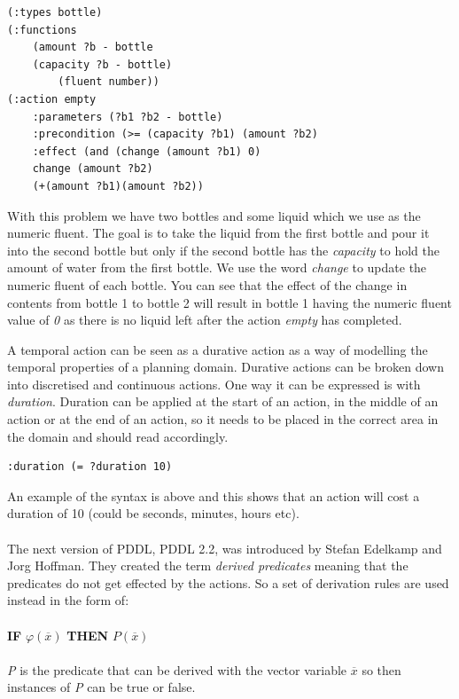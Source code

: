 \begin{verbatim}
(:types bottle)
(:functions
	(amount ?b - bottle
	(capacity ?b - bottle)
		(fluent number))
(:action empty
	:parameters (?b1 ?b2 - bottle)
	:precondition (>= (capacity ?b1) (amount ?b2)
	:effect (and (change (amount ?b1) 0)
	change (amount ?b2)
	(+(amount ?b1)(amount ?b2))
\end{verbatim} 
With this problem we have two bottles and some liquid which we use as the numeric fluent. The goal is to take the liquid from the first bottle and pour it into the second bottle but only if the second bottle has the \textit{capacity} to hold the amount of water from the first bottle. We use the word \textit{change} to update the numeric fluent of each bottle. You can see that the effect of the change in contents from bottle 1 to bottle 2 will result in bottle 1 having the numeric fluent value of \textit{0} as there is no liquid left after the action \textit{empty} has completed. 

A temporal action can be seen as a durative action as a way of modelling the temporal properties of a planning domain\cite{PDDL2.1}. Durative actions can be broken down into discretised and continuous actions. One way it can be expressed is with \textit{duration}. Duration can be applied at the start of an action, in the middle of an action or at the end of an action, so it needs to be placed in the correct area in the domain and should read accordingly. 
\begin{verbatim}
:duration (= ?duration 10)
\end{verbatim}      
An example of the syntax is above and this shows that an action will cost a duration of 10 (could be seconds, minutes, hours etc). 
\\%
\\
The next version of PDDL, PDDL 2.2, was introduced by Stefan Edelkamp and Jorg Hoffman\cite{PDDL2.2}. They created the term \textit{derived predicates} meaning that the predicates do not get effected by the actions. So a set of derivation rules are used instead in the form of:
\\
\\
\textbf{IF}  $\varphi(\overline{x})$  \textbf{THEN}  $P(\overline{x})$\cite{AutomaticPlanning}
\\
\\
\textit{P} is the predicate that can be derived with the vector variable \textit{$\overline{x}$} so then instances of \textit{P} can be true or false. 

